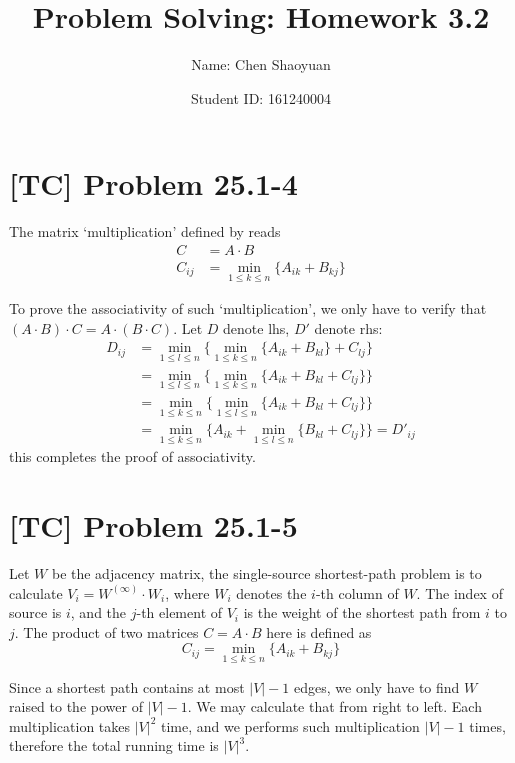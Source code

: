\documentclass[a4paper,11pt,twocolumn]{article}
\newcommand{\homeworkno}{3.2}
\begin{document}
  \title{Problem Solving: Homework \homeworkno}
  \author{Name: Chen Shaoyuan \and Student ID: 161240004}
  \maketitle

  \section{[TC] Problem 25.1-4}
  The matrix `multiplication' defined by  reads
  \begin{align*}
    C &= A \cdot B \\
    C_{ij} &= \min_{1 \leq k \leq n} \{ A_{ik} + B_{kj} \}
  \end{align*}\par
  To prove the associativity of such `multiplication', we only have to verify that $(A \cdot B) \cdot C = A \cdot (B \cdot C)$. Let $D$ denote lhs, $D'$ denote rhs:
  \begin{align*}
    D_{ij} &= \min_{1 \leq l \leq n} \{ \min_{1 \leq k \leq n} \{ A_{ik} + B_{kl} \} + C_{lj} \} \\
    &= \min_{1 \leq l \leq n} \{ \min_{1 \leq k \leq n} \{ A_{ik} + B_{kl} + C_{lj} \} \} \\
    &= \min_{1 \leq k \leq n} \{ \min_{1 \leq l \leq n} \{ A_{ik} + B_{kl} + C_{lj} \} \} \\
    &= \min_{1 \leq k \leq n} \{ A_{ik} + \min_{1 \leq l \leq n} \{B_{kl}  + C_{lj} \} \} = D'_{ij}
  \end{align*}
  this completes the proof of associativity.

  \section{[TC] Problem 25.1-5}
  Let $W$ be the adjacency matrix, the single-source shortest-path problem is to calculate $V_i = W ^ {(\infty)} \cdot W_i$, where $W_i$ denotes the $i$-th column of $W$. The index of source is $i$, and the $j$-th element of $V_i$ is the weight of the shortest path from $i$ to $j$. The product of two matrices $C = A \cdot B$ here is defined as
  $$ C_{ij} = \min_{1 \leq k \leq n} \{ A_{ik} + B_{kj} \} $$ \par
  Since a shortest path contains at most $|V|-1$ edges, we only have to find $W$ raised to the power of $|V|-1$. We may calculate that from right to left. Each multiplication takes $|V|^2$ time, and we performs such multiplication $|V|-1$ times, therefore the total running time is $|V|^3$.
\end{document}

